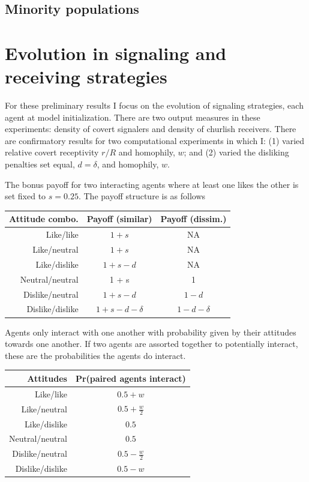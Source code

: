 \documentclass[11pt,letterpaper]{article}
\begin{document}
\subsection{Minority populations}


\appendix

\section{Evolution in signaling and receiving strategies}

For these preliminary results I focus on the evolution of signaling strategies,
each agent at model initialization. There are two output measures in these experiments:
density of covert signalers and density of churlish receivers. 
There are confirmatory results for two computational experiments in which I: 
(1) varied relative covert receptivity $r/R$ and 
homophily, $w$; and (2) varied the disliking penalties set equal, $d=\delta$,
and homophily, $w$.

The bonus payoff for two 
interacting agents where at least one
likes the other is set fixed to $s=0.25$. The payoff structure is as follows

\begin{table}[H]
  \centering
  \begin{tabular}{rcc}
    Attitude combo. & Payoff (similar) & Payoff (dissim.) \\
   \toprule
    Like/like & $1 + s$                    & NA \\
    Like/neutral & $1 + s$                 & NA \\
    Like/dislike & $1 + s - d$             & NA \\
    Neutral/neutral & 1 + s                & 1  \\
    Dislike/neutral & $1 + s - d$          & $1-d$\\
    Dislike/dislike & $1 + s - d - \delta$ & $1 - d - \delta$
  \end{tabular}
\end{table}

Agents only interact with one another with probability given by their attitudes
towards one another. If two agents are assorted together to potentially 
interact, these are the probabilities the agents do interact.

\begin{table}[H]
  \centering
  \begin{tabular}{rc}
    Attitudes & Pr(paired agents interact) \\
    \toprule
    Like/like & $0.5 + w$ \\
    Like/neutral & $0.5 + \frac{w}{2}$ \\
    Like/dislike & $0.5$ \\
    Neutral/neutral & $0.5$ \\
    Dislike/neutral & $0.5 - \frac{w}{2}$ \\
    Dislike/dislike & $0.5 - w$ 
  \end{tabular}
\end{table}
\end{document}
